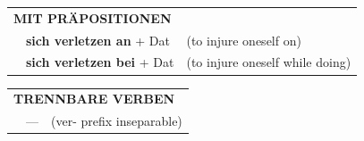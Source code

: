 \documentclass[10pt,a4paper]{revtex4-2}
\begin{document}
\begin{verbbox}
\vspace{10pt}

\begin{tabular}{lll}
\multicolumn{3}{l}{\textbf{MIT PRÄPOSITIONEN}}\\
& \textbf{sich verletzen an} + Dat & (to injure oneself on)\\
& \textbf{sich verletzen bei} + Dat & (to injure oneself while doing)\\
\end{tabular}
\hfill
\begin{tabular}{lll}
\multicolumn{3}{l}{\textbf{TRENNBARE VERBEN}}\\
& --- & (ver- prefix inseparable)\\
\end{tabular}
\vspace{-5pt}
\end{verbbox}
\end{document}
